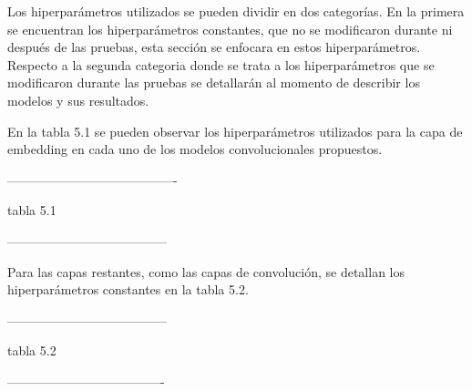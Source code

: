 Los hiperparámetros utilizados se pueden dividir en dos categorías. En la primera se encuentran los hiperparámetros constantes, que no se modificaron durante ni después de las pruebas, esta sección se enfocara en estos hiperparámetros. Respecto a la segunda categoria donde se trata a los hiperparámetros que se modificaron durante las pruebas se detallarán al momento de describir los modelos y sus resultados.

En la tabla 5.1 se pueden observar los hiperparámetros utilizados para la capa de embedding en cada uno de los modelos convolucionales propuestos.

----------------------------------------

tabla 5.1

--------------------------------------

Para las capas restantes, como las capas de convolución, se detallan los hiperparámetros constantes en la tabla 5.2.

--------------------------------------

tabla 5.2

-------------------------------------


